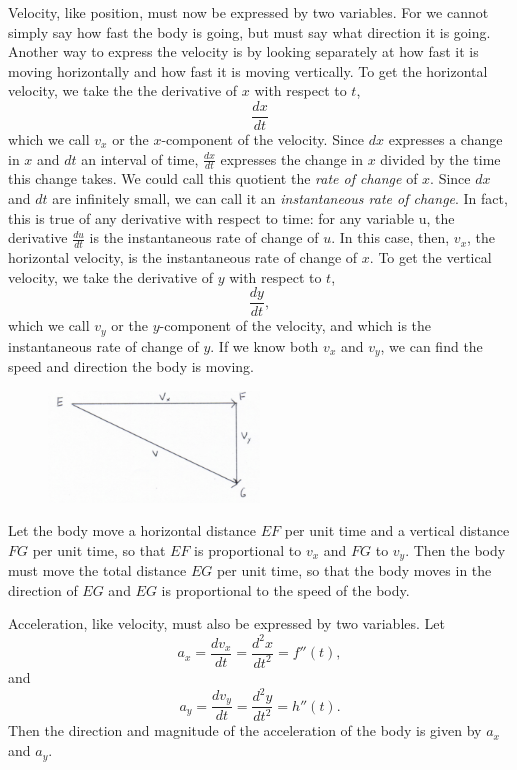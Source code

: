 \documentclass[twoside,openright]{article}
\begin{document}
Velocity, like position, must now be expressed by two variables.  For
we cannot simply say how fast the body is going, but must say what
direction it is going.  Another way to express the velocity is by
looking separately at how fast it is moving horizontally and how fast
it is moving vertically.  To get the horizontal velocity, we take the
the derivative of $x$ with respect to $t$,
$$\frac{dx}{dt}$$
which we call $v_x$ or the $x$-component of the velocity.  Since $dx$
expresses a change in $x$ and $dt$ an interval of time,
$\frac{dx}{dt}$ expresses the change in $x$ divided by the time this
change takes.  We could call this quotient the {\em rate of change} of
$x$.  Since $dx$ and $dt$ are infinitely small, we can call it an {\em
  instantaneous rate of change}.  In fact, this is true of any
derivative with respect to time: for any variable u, the derivative
$\frac{du}{dt}$ is the instantaneous rate of change of $u$.  In this
case, then, $v_x$, the horizontal velocity, is the instantaneous rate
of change of $x$.  To get the vertical velocity, we take the
derivative of $y$ with respect to $t$,
$$\frac{dy}{dt},$$
which we call $v_y$ or the $y$-component of the velocity, and which is
the instantaneous rate of change of $y$.  If we know both $v_x$ and
$v_y$, we can find the speed and direction the body is moving.
\begin{figure}[htp]
  \begin{center}
    \includegraphics[width=0.5\textwidth]{fig/Figure82}
    \caption{}
  \end{center}
\end{figure}
Let the body move a horizontal distance $EF$ per unit time and a
vertical distance $FG$ per unit time, so that $EF$ is proportional to
$v_x$ and $FG$ to $v_y$.  Then the body must move the total distance
$EG$ per unit time, so that the body moves in the direction of $EG$
and $EG$ is proportional to the speed of the body.

Acceleration, like velocity, must also be expressed by two variables.
Let
$$a_x = \frac{dv_x}{dt} = \frac{d^2x}{dt^2} = f''(t),$$
and
$$a_y = \frac{dv_y}{dt} = \frac{d^2y}{dt^2} = h''(t).$$
Then the direction and magnitude of the acceleration of the body is
given by $a_x$ and $a_y$.
\end{document}
